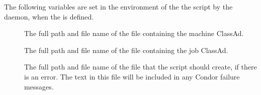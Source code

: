 The following variables are set in the environment of the
the  script by the 
daemon, when the  is defined.
\begin{description}
\item[]
  The full path and file name of the file containing the machine ClassAd.
\item[]
  The full path and file name of the file containing the job ClassAd.
\item[]
  The full path and file name of the file that the 
  script should create, if there is an error.
  The text in this file will be included in any Condor failure messages. 
\end{description}
